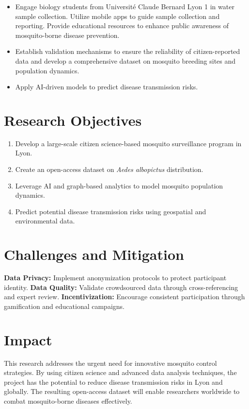 \documentclass[acmlarge]{acmart}
\begin{document}
\begin{itemize}
    \item Engage biology students from Université Claude Bernard Lyon 1 in water sample collection. Utilize mobile apps to guide sample collection and reporting. Provide educational resources to enhance public awareness of mosquito-borne disease prevention.
    \item Establish validation mechanisms to ensure the reliability of citizen-reported data and develop a comprehensive dataset on mosquito breeding sites and population dynamics.
    \item Apply AI-driven models to predict disease transmission risks.
\end{itemize}


\section{Research Objectives}
\begin{enumerate}
    \item Develop a large-scale citizen science-based mosquito surveillance program in Lyon.
    \item Create an open-access dataset on \textit{Aedes albopictus} distribution.
    \item Leverage AI and graph-based analytics to model mosquito population dynamics.
    \item Predict potential disease transmission risks using geospatial and environmental data.
\end{enumerate}


\section{Challenges and Mitigation}
\textbf{Data Privacy:} Implement anonymization protocols to protect participant identity.  
\textbf{Data Quality:} Validate crowdsourced data through cross-referencing and expert review.  
\textbf{Incentivization:} Encourage consistent participation through gamification and educational campaigns.


\section{Impact}
This research addresses the urgent need for innovative mosquito control strategies. By using citizen science and advanced data analysis techniques, the project has the potential to reduce disease transmission risks in Lyon and globally. The resulting open-access dataset will enable researchers worldwide to combat mosquito-borne diseases effectively.
\end{document}
